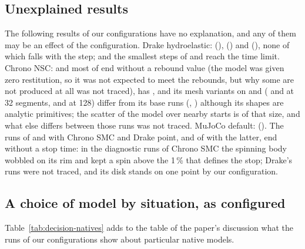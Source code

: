 \subsection{Unexplained results}

The following results of our configurations have no explanation, and any of them may be an
effect of the configuration. Drake hydroelastic:  (),
 () and  (), none of
which falls with the step;  and the smallest steps of  and
 reach the time limit. Chrono NSC:  and most of 
end without a rebound value (the model was given zero restitution, so it was not expected to
meet the rebounds, but why some are not produced at all was not traced),  has
, and its mesh variants on  and 
( and  at 32 segments,
 and  at 128) differ from its
base runs (, ) although its shapes are analytic
primitives; the scatter of the model over nearby starts is of that size, and what else differs
between those runs was not traced. MuJoCo default:  ().
The runs of  and  with Chrono SMC and Drake point, and of 
with the latter, end without a stop time: in the diagnostic runs of Chrono SMC the spinning
body wobbled on its rim and kept a spin above the 1\,\% that defines the stop; Drake's runs
were not traced, and its disk stands on one point by our configuration.

\subsection{A choice of model by situation, as configured}

Table~\ref{tab:decision-natives} adds to the table of the paper's discussion what the runs of
our configurations show about particular native models.

